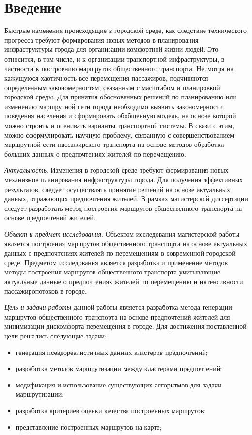\part{Введение}
Быстрые изменения происходящие в городской среде, как следствие технического прогресса требуют формирования 
новых методов в планирования инфраструктуры города для организации комфортной жизни людей. Это относится, в 
том числе, и к организации транспортной инфраструктуры, в частности к построению маршрутов общественного 
транспорта. Несмотря на кажущуюся хаотичность все перемещения пассажиров, подчиняются определенным 
закономерностям, связанным с масштабом и планировкой городской среды. Для принятия обоснованных решений по 
планированию или изменению маршрутной сети города необходимо выявить закономерности поведения населения и 
сформировать обобщенную модель, на основе которой можно строить и оценивать варианты транспортной системы. 
В связи с этим, можно сформулировать научную проблему, связанную с совершенствованием маршрутной сети 
пассажирского транспорта на основе методов обработки больших данных о предпочтениях жителей по перемещению. 

\emph{Актуальность}. Изменения в городской среде требуют формирования новых механизмов планирования 
инфраструктуры города. Для получения эффективных результатов, следует осуществлять принятие решений на основе 
актуальных данных, отражающих предпочтения жителей. В рамках магистерской диссертации следует разработать 
метод построения маршрутов общественного транспорта на основе предпочтений жителей.

\emph{Объект и предмет исследования}. Объектом исследования магистерской работы является построения маршрутов 
общественного транспорта на основе актуальных данных о предпочтениях жителей по перемещениям в современной 
городской среде. Предметом исследования является разработка и применение методов методы построения маршрутов 
общественного транспорта учитывающие актуальные данные о предпочтениях жителей по перемещению и интенсивности 
пассажиропотоков в городе.

\emph{Цель и задачи работы} данной работы является разработка метода генерации маршрутов общественного 
транспорта на основе предпочтений жителей для минимизации дискомфорта перемещения в городе. Для достижения 
поставленной цели решались следующие задачи:
\begin{itemize}
    \item генерация псевдореалистичных данных кластеров предпочтений;
    \item разработка методов маршрутизации между кластерами предпочтений;
    \item модификация и использование существующих алгоритмов для задачи маршрутизации;
    \item разработка критериев оценки качества построенных маршрутов;
    \item представление построенных маршрутов на карте;
\end{itemize}

